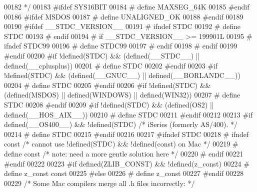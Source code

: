 \begin{DoxyCode}
00182 \textcolor{comment}{ */}
00183 \textcolor{preprocessor}{#ifdef SYS16BIT}
00184 \textcolor{preprocessor}{#  define MAXSEG\_64K}
00185 \textcolor{preprocessor}{#endif}
00186 \textcolor{preprocessor}{#ifdef MSDOS}
00187 \textcolor{preprocessor}{#  define UNALIGNED\_OK}
00188 \textcolor{preprocessor}{#endif}
00189 
00190 \textcolor{preprocessor}{#ifdef \_\_STDC\_VERSION\_\_}
00191 \textcolor{preprocessor}{#  ifndef STDC}
00192 \textcolor{preprocessor}{#    define STDC}
00193 \textcolor{preprocessor}{#  endif}
00194 \textcolor{preprocessor}{#  if \_\_STDC\_VERSION\_\_ >= 199901L}
00195 \textcolor{preprocessor}{#    ifndef STDC99}
00196 \textcolor{preprocessor}{#      define STDC99}
00197 \textcolor{preprocessor}{#    endif}
00198 \textcolor{preprocessor}{#  endif}
00199 \textcolor{preprocessor}{#endif}
00200 \textcolor{preprocessor}{#if !defined(STDC) && (defined(\_\_STDC\_\_) || defined(\_\_cplusplus))}
00201 \textcolor{preprocessor}{#  define STDC}
00202 \textcolor{preprocessor}{#endif}
00203 \textcolor{preprocessor}{#if !defined(STDC) && (defined(\_\_GNUC\_\_) || defined(\_\_BORLANDC\_\_))}
00204 \textcolor{preprocessor}{#  define STDC}
00205 \textcolor{preprocessor}{#endif}
00206 \textcolor{preprocessor}{#if !defined(STDC) && (defined(MSDOS) || defined(WINDOWS) || defined(WIN32))}
00207 \textcolor{preprocessor}{#  define STDC}
00208 \textcolor{preprocessor}{#endif}
00209 \textcolor{preprocessor}{#if !defined(STDC) && (defined(OS2) || defined(\_\_HOS\_AIX\_\_))}
00210 \textcolor{preprocessor}{#  define STDC}
00211 \textcolor{preprocessor}{#endif}
00212 
00213 \textcolor{preprocessor}{#if defined(\_\_OS400\_\_) && !defined(STDC)    }\textcolor{comment}{/* iSeries (formerly AS/400). */}\textcolor{preprocessor}{}
00214 \textcolor{preprocessor}{#  define STDC}
00215 \textcolor{preprocessor}{#endif}
00216 
00217 \textcolor{preprocessor}{#ifndef STDC}
00218 \textcolor{preprocessor}{#  ifndef const }\textcolor{comment}{/* cannot use !defined(STDC) && !defined(const) on Mac */}\textcolor{preprocessor}{}
00219 \textcolor{preprocessor}{#    define const       }\textcolor{comment}{/* note: need a more gentle solution here */}\textcolor{preprocessor}{}
00220 \textcolor{preprocessor}{#  endif}
00221 \textcolor{preprocessor}{#endif}
00222 
00223 \textcolor{preprocessor}{#if defined(ZLIB\_CONST) && !defined(z\_const)}
00224 \textcolor{preprocessor}{#  define z\_const const}
00225 \textcolor{preprocessor}{#else}
00226 \textcolor{preprocessor}{#  define z\_const}
00227 \textcolor{preprocessor}{#endif}
00228 
00229 \textcolor{comment}{/* Some Mac compilers merge all .h files incorrectly: */}

\end{DoxyCode}
